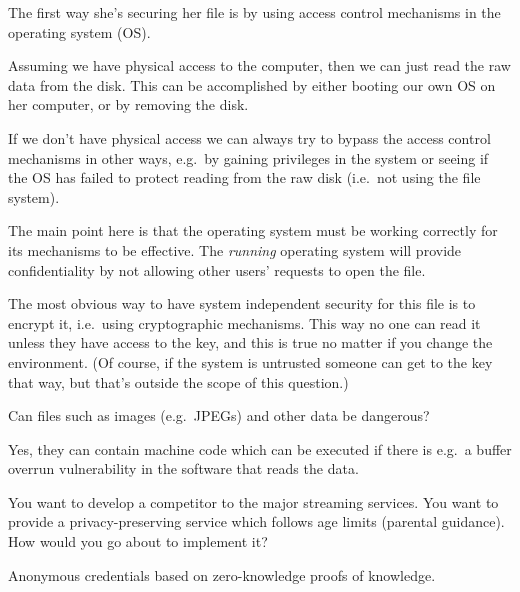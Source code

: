 \begin{frame}
  \begin{solution}
    The first way she's securing her file is by using access control mechanisms 
    in the operating system (OS).

    Assuming we have physical access to the computer, then we can just read the 
    raw data from the disk.
    This can be accomplished by either booting our own OS on her computer, or 
    by removing the disk.

    If we don't have physical access we can always try to bypass the access 
    control mechanisms in other ways, e.g.\ by gaining privileges in the system 
    or seeing if the OS has failed to protect reading from the raw disk (i.e.\ 
    not using the file system).

    The main point here is that the operating system must be working correctly 
    for its mechanisms to be effective.
    The \emph{running} operating system will provide confidentiality by not 
    allowing other users' requests to open the file.

    The most obvious way to have system independent security for this file is 
    to encrypt it, i.e.~using cryptographic mechanisms.
    This way no one can read it unless they have access to the key, and this is 
    true no matter if you change the environment.
    (Of course, if the system is untrusted someone can get to the key that way, 
    but that's outside the scope of this question.)
  \end{solution}
\end{frame}


  
\begin{frame}
  \begin{exercise}
    Can files such as images (e.g.\ JPEGs) and other data be dangerous?
  \end{exercise}
\end{frame}

\begin{frame}
  \begin{solution}
    Yes, they can contain machine code which can be executed if there is e.g.\ 
    a buffer overrun vulnerability in the software that reads the data.
  \end{solution}
\end{frame}



\begin{frame}
  \begin{exercise}
    You want to develop a competitor to the major streaming services.
    You want to provide a privacy-preserving service which follows age limits 
    (parental guidance).
    How would you go about to implement it?
  \end{exercise}
\end{frame}

\begin{frame}
  \begin{solution}
    Anonymous credentials based on zero-knowledge proofs of knowledge.
  \end{solution}
\end{frame}




\begin{frame}[allowframebreaks]
  \printbibliography
\end{frame}
